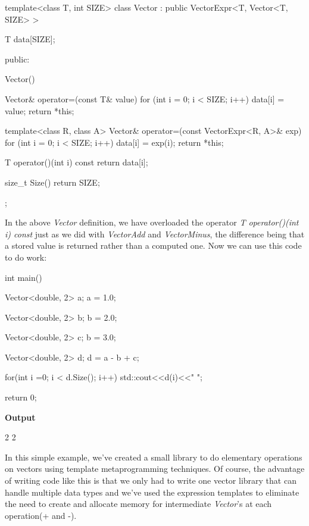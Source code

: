 \documentclass[12pt,a4paper]{article}
\begin{document}
\begin{cppsource}
template<class T, int SIZE>
class Vector : public VectorExpr<T, Vector<T, SIZE> > {
    T data[SIZE];

public:

    Vector() {
    }

    Vector& operator=(const T& value){
        for (int i = 0; i < SIZE; i++) {
            data[i] = value;
        }
        return *this;
    }
    
    template<class R, class A>
    Vector& operator=(const VectorExpr<R, A>& exp) {
        for (int i = 0; i < SIZE; i++) {
            data[i] = exp(i);
        }
        return *this;
    }

    T operator()(int i) const {
        return data[i];
    }

    size_t Size(){
        return SIZE;
    }
 };   
\end{cppsource}
In the above \textit{Vector} definition, we have overloaded the operator \textit{T operator()(int i) const} just as we did with  \textit{VectorAdd} and \textit{VectorMinus}, the difference being that a stored value is returned rather than a computed one. Now we can use this code to do work:
\begin{cppsource}

int main() {

    Vector<double, 2> a;
    a = 1.0;
    
    Vector<double, 2> b;
    b = 2.0;
    
    Vector<double, 2> c;
    b = 3.0;
    
    Vector<double, 2> d;
    d = a - b + c;

    for(int i =0; i < d.Size(); i++){
        std::cout<<d(i)<<" ";
    }

    return 0;
}
\end{cppsource}

\textbf{Output}
\begin{myoutput}
2 2
\end{myoutput}

In this simple example, we've created a small library to do elementary operations on vectors using template metaprogramming techniques. Of course, the advantage of writing code like this is that we only had to write one vector library that can handle multiple data types and we've used the expression templates to eliminate the need to create and allocate memory for intermediate \textit{Vector}'s at each operation(+ and -).
\end{document}
